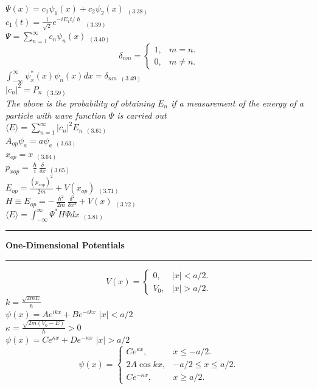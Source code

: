 \documentclass[0pt]{report}
\begin{document}
\begin{multicols}{3}
\begin{flushleft}
$\Psi(x)=c_1\psi_1(x)+c_2\psi_2(x)$ $_{(3.38)}$\\
$c_1(t)=\frac{1}{\sqrt{2}}e^{-iE_1t/\hslash}$ $_{(3.39)}$\\
$\Psi=\sum_{n=1}^{\infty}c_n\psi_n(x)$ $_{(3.40)}$\\
\begin{equation*}
  \delta_{nm}=\begin{cases}
    1, & \text{$m=n$}.\\
    0, & \text{$m\neq n$}.
  \end{cases}
\end{equation*}
$\int_{-\infty}^{\infty}\psi_x^*(x)\psi_n(x)dx=\delta_{nm}$ $_{(3.49)}$\\
$|c_n|^2=P_n$ $_{(3.59)}$\\
\textit{The above is the probability of obtaining $E_n$ if a measurement of the energy of a particle with wave function $\Psi$ is carried out}\\
$\langle E\rangle=\sum_{n=1}^{\infty}|c_n|^2E_n$ $_{(3.61)}$\\
$A_{op}\psi_a=a\psi_a$ $_{(3.63)}$\\
$x_{op}=x$ $_{(3.64)}$\\
$p_{xop}=\frac{\hslash}{i}\frac{\delta}{\delta x}$ $_{(3.65)}$\\
$E_{op}=\frac{(p_{xop})^2}{2m}+V(x_{op})$ $_{(3.71)}$\\
$H\equiv E_{op}=-\frac{\hslash^2}{2m}\frac{\delta^2}{\delta x^2}+V(x)$ $_{(3.72)}$\\
$\langle E\rangle=\int_{-\infty}^{\infty}\Psi^*H\Psi dx$ $_{(3.81)}$\\

\noindent\rule[0.5ex]{\linewidth}{1pt}
\textbf{One-Dimensional Potentials}\\
\noindent\rule[0.5ex]{\linewidth}{.25pt}
\begin{equation*}
  V(x)=\begin{cases}
    0, & \text{$|x|<a/2$}.\\
    V_0, & \text{$|x|>a/2$}.
  \end{cases}
\end{equation*}
$k=\frac{\sqrt{2mE}}{\hslash}$\\
$\psi(x)=Ae^{ikx}+Be^{-ikx}$ $|x|<a/2$\\
$\kappa=\frac{\sqrt{2m(V_0-E)}}{\hslash}>0$\\
$\psi(x)=Ce^{\kappa x}+De^{-\kappa x}$ $|x|>a/2$\\
\begin{equation*}
  \psi(x)=\begin{cases}
    Ce^{\kappa x}, & \text{$x\leq -a/2$}.\\
    2A\cos kx, & \text{$-a/2\leq x\leq a/2$}.\\
    Ce^{-\kappa x}, & \text{$x\geq a/2$}.
  \end{cases}
\end{equation*}


\end{flushleft}
\end{multicols}
\end{document}
